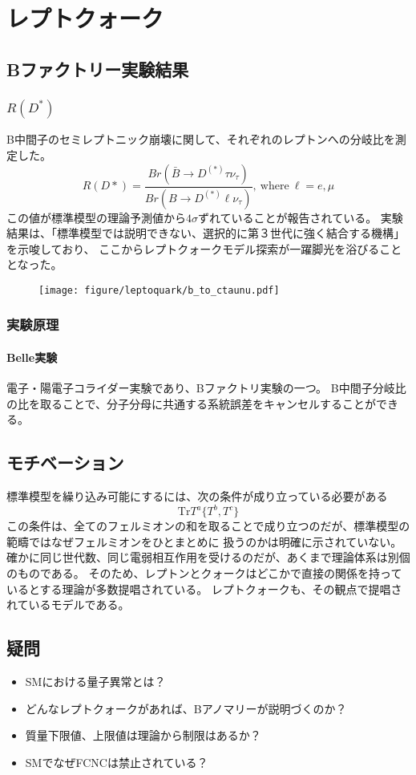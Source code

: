 
\chapter{レプトクォーク}

\section{Bファクトリー実験結果}

\subsection{$R(D^*)$}

B中間子のセミレプトニック崩壊に関して、それぞれのレプトンへの分岐比を測定した。
\begin{equation}
  R(D*)=\frac{Br(\bar{B}\to D^{(*)} \tau\nu_\tau)}{Br(B\to D^{(*)} \ell\nu_\tau)},~\mathrm{where}~\ell=e,\mu
\end{equation}
この値が標準模型の理論予測値から$4\sigma$ずれていることが報告されている。
実験結果は、「標準模型では説明できない、選択的に第３世代に強く結合する機構」を示唆しており、
ここからレプトクォークモデル探索が一躍脚光を浴びることとなった。

\begin{figure}
  \centering
  \texttt{[image: figure/leptoquark/b\_to\_ctaunu.pdf]}
\end{figure}

\subsection{実験原理}
\subsubsection{Belle実験}

電子・陽電子コライダー実験であり、Bファクトリ実験の一つ。
B中間子分岐比の比を取ることで、分子分母に共通する系統誤差をキャンセルすることができる。


\section{モチベーション}

標準模型を繰り込み可能にするには、次の条件が成り立っている必要がある
\begin{equation}
  \mathrm{Tr} T^a\{T^b,T^c\}
\end{equation}
この条件は、全てのフェルミオンの和を取ることで成り立つのだが、標準模型の範疇ではなぜフェルミオンをひとまとめに
扱うのかは明確に示されていない。
確かに同じ世代数、同じ電弱相互作用を受けるのだが、あくまで理論体系は別個のものである。
そのため、レプトンとクォークはどこかで直接の関係を持っているとする理論が多数提唱されている。
レプトクォークも、その観点で提唱されているモデルである。


\section{疑問}
\begin{itemize}
    \item SMにおける量子異常とは？
    \item どんなレプトクォークがあれば、Bアノマリーが説明づくのか？
    \item 質量下限値、上限値は理論から制限はあるか？
    \item SMでなぜFCNCは禁止されている？
\end{itemize}

